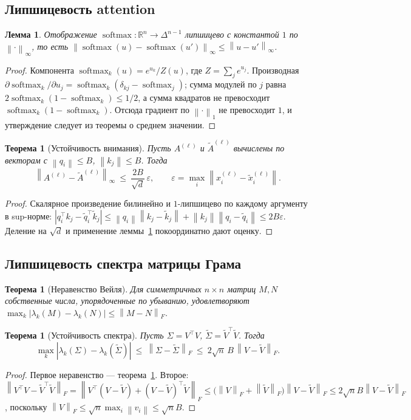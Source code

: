 \documentclass[11pt,a4paper]{article}
\theoremstyle{definition}
\theoremstyle{plain}
\newtheorem{theorem}[definition]{Теорема}
\newtheorem{lemma}[definition]{Лемма}
\newcommand{\R}{\mathbb{R}}
\newcommand{\norm}[1]{\left\lVert #1 \right\rVert}
\newcommand{\abs}[1]{\left\lvert #1 \right\rvert}
\DeclareMathOperator{\softmax}{softmax}
\begin{document}
\subsection{Липшицевость attention}

\begin{lemma}\label{lem:softmax}
Отображение $\softmax\colon\R^n\to\Delta^{n-1}$ липшицево с константой $1$ по
$\norm{\cdot}_\infty$, то есть $\norm{\softmax(u)-\softmax(u')}_\infty\le\norm{u-u'}_\infty$.
\end{lemma}
\begin{proof}
Компонента $\softmax_k(u)=e^{u_k}/Z(u)$, где $Z=\sum_j e^{u_j}$. Производная
$\partial\softmax_k/\partial u_j=\softmax_k(\delta_{kj}-\softmax_j)$; сумма модулей по $j$
равна $2\softmax_k(1-\softmax_k)\le 1/2$, а сумма квадратов не превосходит $\softmax_k(1-\softmax_k)$.
Отсюда градиент по $\norm{\cdot}_1$ не превосходит $1$, и утверждение следует из теоремы о
среднем значении.
\end{proof}

\begin{theorem}[Устойчивость внимания]\label{thm:attn}
Пусть $A^{(\ell)}$ и $\tilde A^{(\ell)}$ вычислены по векторам с $\norm{q_i}\le B$,
$\norm{k_j}\le B$. Тогда
\[
\norm{A^{(\ell)}-\tilde A^{(\ell)}}_\infty\ \le\ \frac{2B}{\sqrt d}\,\varepsilon,
\qquad \varepsilon=\max_i\norm{x_i^{(\ell)}-\tilde x_i^{(\ell)}} .
\]
\end{theorem}
\begin{proof}
Скалярное произведение билинейно и $1$-липшицево по каждому аргументу в sup-норме:
$\abs{q_i^\top k_j-\tilde q_i^\top\tilde k_j}\le \norm{q_i}\norm{k_j-\tilde k_j}+\norm{k_j}\norm{q_i-\tilde q_i}\le 2B\varepsilon$.
Деление на $\sqrt d$ и применение леммы~\ref{lem:softmax} покоординатно дают оценку.
\end{proof}

\subsection{Липшицевость спектра матрицы Грама}

\begin{theorem}[Неравенство Вейля]\label{thm:weyl}
Для симметричных $n\times n$ матриц $M,N$ собственные числа, упорядоченные по убыванию,
удовлетворяют $\max_k\abs{\lambda_k(M)-\lambda_k(N)}\le\norm{M-N}_F$.
\end{theorem}

\begin{theorem}[Устойчивость спектра]\label{thm:spec}
Пусть $\Sigma=V^\top V$, $\tilde\Sigma=\tilde V^\top\tilde V$. Тогда
\[
\max_k\abs{\lambda_k(\Sigma)-\lambda_k(\tilde\Sigma)}
\ \le\ \norm{\Sigma-\tilde\Sigma}_F
\ \le\ 2\sqrt n\,B\,\norm{V-\tilde V}_F .
\]
\end{theorem}
\begin{proof}
Первое неравенство — теорема~\ref{thm:weyl}. Второе:
$\norm{V^\top V-\tilde V^\top\tilde V}_F=\norm{V^\top(V-\tilde V)+(V-\tilde V)^\top\tilde V}_F\le \bigl(\norm{V}_F+\norm{\tilde V}_F\bigr)\norm{V-\tilde V}_F\le 2\sqrt n B\norm{V-\tilde V}_F$,
поскольку $\norm{V}_F\le\sqrt n\max_i\norm{v_i}\le\sqrt n B$.
\end{proof}
\end{document}
